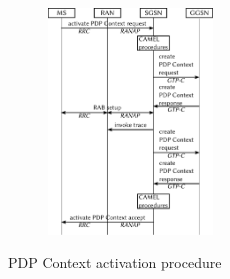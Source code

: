 \documentclass{beamer}
\begin{document}
\begin{frame}
\begin{columns}[T]
    	\begin{column}[T]{5cm}
			\begin{figure}
				\centering
				\includegraphics[height=6cm]{../../chapters/04-mobilenets/images/pdp-context-activation-procedure.pdf}
			\end{figure}
			\vspace{-0.5cm}
			{\small PDP Context activation procedure}
		\end{column}
	\end{columns}
\end{frame}
\end{document}
